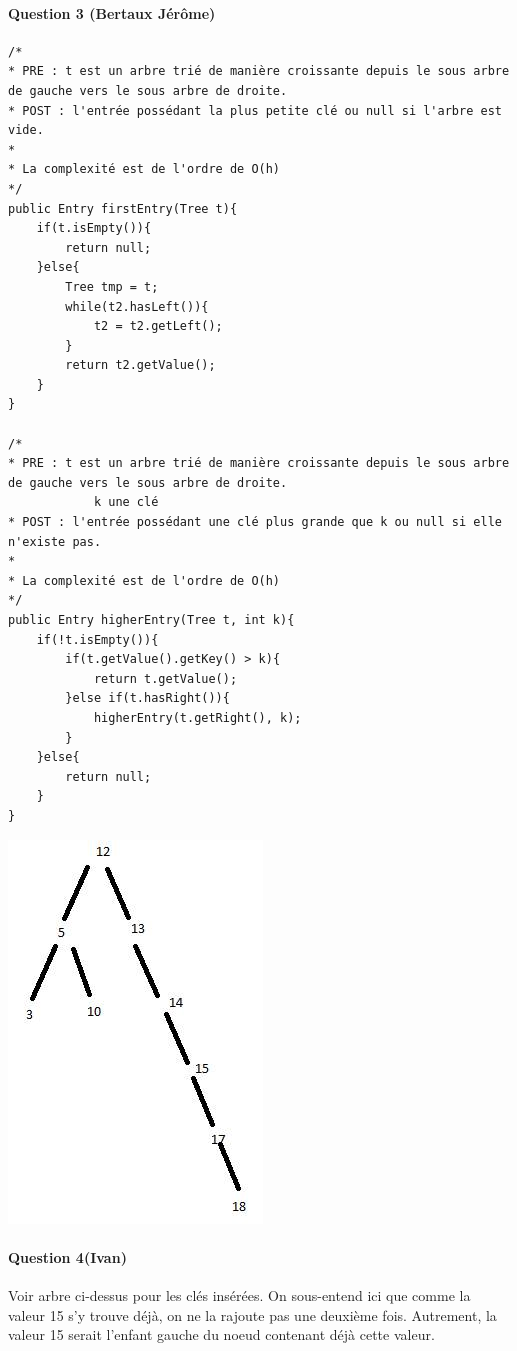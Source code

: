\documentclass[a4paper]{article}
\begin{document}
\paragraph*{Question 3 (Bertaux Jérôme)}
\begin{verbatim}
/*
* PRE : t est un arbre trié de manière croissante depuis le sous arbre de gauche vers le sous arbre de droite.
* POST : l'entrée possédant la plus petite clé ou null si l'arbre est vide.
* 
* La complexité est de l'ordre de O(h)
*/
public Entry firstEntry(Tree t){
	if(t.isEmpty()){
		return null;
	}else{
		Tree tmp = t;
		while(t2.hasLeft()){
			t2 = t2.getLeft();		
		}
		return t2.getValue();	
	}
}

/*
* PRE : t est un arbre trié de manière croissante depuis le sous arbre de gauche vers le sous arbre de droite.
			k une clé
* POST : l'entrée possédant une clé plus grande que k ou null si elle n'existe pas.
* 
* La complexité est de l'ordre de O(h)
*/
public Entry higherEntry(Tree t, int k){
	if(!t.isEmpty()){
		if(t.getValue().getKey() > k){
			return t.getValue();		
		}else if(t.hasRight()){
			higherEntry(t.getRight(), k);		
		}	
	}else{
		return null;	
	}
}
\end{verbatim}
\newpage


\includegraphics[scale=0.5]{arbre.png}
\paragraph*{Question 4(Ivan)}

Voir arbre ci-dessus pour les clés insérées. On sous-entend ici que comme la valeur 15 s'y trouve déjà, on ne la rajoute pas une deuxième fois. Autrement, la valeur 15 serait l'enfant gauche du noeud contenant déjà cette valeur. 
\\
\end{document}
